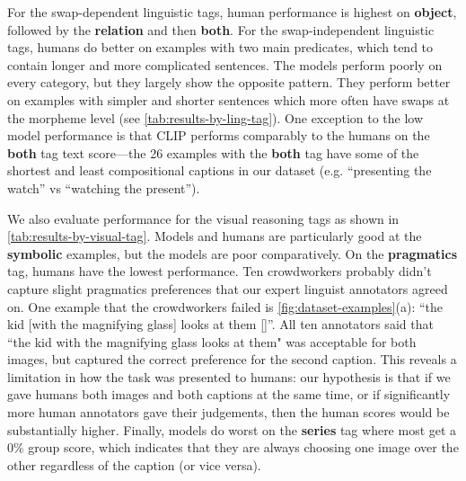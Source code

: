 \documentclass[10pt,twocolumn,letterpaper]{article}
\begin{document}
For the swap-dependent linguistic tags, human performance is highest on \textbf{object}, followed by the \textbf{relation} and then \textbf{both}. For the swap-independent linguistic tags, humans do better on examples with two main predicates, which tend to contain longer and more complicated sentences. The models perform poorly on every category, but they largely show the opposite pattern. They perform better on examples with simpler and shorter sentences which more often have swaps at the morpheme level (see \cref{tab:results-by-ling-tag}). One exception to the low model performance is that CLIP performs comparably to the humans on the \textbf{both} tag text score---the 26 examples with the \textbf{both} tag have some of the shortest and least compositional captions in our dataset (e.g. ``presenting the watch'' vs ``watching the present''). 

We also evaluate performance for the visual reasoning tags as shown in \cref{tab:results-by-visual-tag}. Models and humans are particularly good at the \textbf{symbolic} examples, but the models are poor comparatively. On the \textbf{pragmatics} tag, humans have the lowest performance. Ten crowdworkers probably didn't capture slight pragmatics preferences that our expert linguist annotators agreed on. One example that the crowdworkers failed is \cref{fig:dataset-examples}(a): “the kid [with the magnifying glass] looks at them []”. All ten annotators said that ``the kid with the magnifying glass looks at them" was acceptable for both images, but captured the correct preference for the second caption. This reveals a limitation in how the task was presented to humans: our hypothesis is that if we gave humans both images and both captions at the same time, or if significantly more human annotators gave their judgements, then the human scores would be substantially higher. Finally, models do worst on the \textbf{series} tag where most get a 0\% group score, which indicates that they are always choosing one image over the other regardless of the caption (or vice versa).
\end{document}
